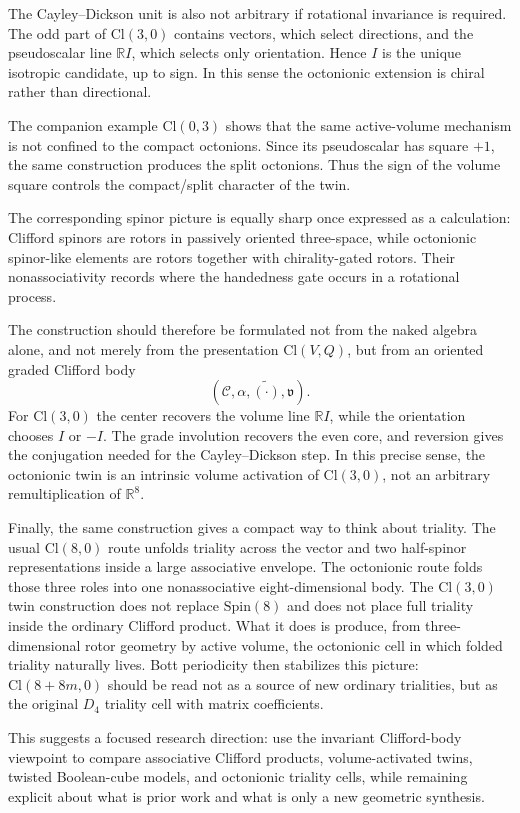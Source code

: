 \documentclass[11pt]{article}
\newcommand{\Cl}{\mathrm{Cl}}
\begin{document}
The Cayley--Dickson unit is also not arbitrary if rotational invariance is
required. The odd part of $\Cl(3,0)$ contains vectors, which select directions,
and the pseudoscalar line $\mathbb RI$, which selects only orientation. Hence
$I$ is the unique isotropic candidate, up to sign. In this sense the
octonionic extension is chiral rather than directional.

The companion example $\Cl(0,3)$ shows that the same active-volume mechanism
is not confined to the compact octonions. Since its pseudoscalar has square
$+1$, the same construction produces the split octonions. Thus the sign of the
volume square controls the compact/split character of the twin.

The corresponding spinor picture is equally sharp once expressed as a
calculation: Clifford spinors are rotors in passively oriented three-space,
while octonionic spinor-like elements are rotors together with chirality-gated
rotors. Their nonassociativity records where the handedness gate occurs in a
rotational process.

The construction should therefore be formulated not from the naked algebra
alone, and not merely from the presentation $\Cl(V,Q)$, but from an oriented
graded Clifford body
\[
(\mathcal C,\alpha,\widetilde{(\cdot)},\mathfrak v).
\]
For $\Cl(3,0)$ the center recovers the volume line $\mathbb RI$, while the
orientation chooses $I$ or $-I$. The grade involution recovers the even core,
and reversion gives the conjugation needed for the Cayley--Dickson step. In
this precise sense, the octonionic twin is an intrinsic volume activation of
$\Cl(3,0)$, not an arbitrary remultiplication of $\mathbb R^8$.

Finally, the same construction gives a compact way to think about triality.
The usual $\Cl(8,0)$ route unfolds triality across the vector and two half-spinor
representations inside a large associative envelope. The octonionic route folds
those three roles into one nonassociative eight-dimensional body. The
$\Cl(3,0)$ twin construction does not replace $\mathrm{Spin}(8)$ and does not
place full triality inside the ordinary Clifford product. What it does is
produce, from three-dimensional rotor geometry by active volume, the octonionic
cell in which folded triality naturally lives. Bott periodicity then stabilizes
this picture: $\Cl(8+8m,0)$ should be read not as a source of new ordinary
trialities, but as the original $D_4$ triality cell with matrix coefficients.

This suggests a focused research direction: use the invariant Clifford-body
viewpoint to compare associative Clifford products, volume-activated twins,
twisted Boolean-cube models, and octonionic triality cells, while remaining
explicit about what is prior work and what is only a new geometric synthesis.
\end{document}
